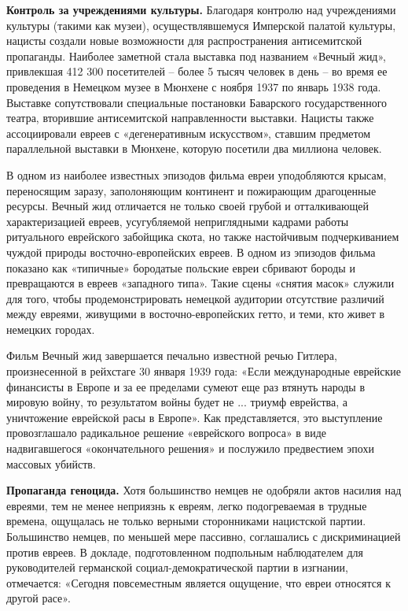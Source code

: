 \textbf{Контроль за учреждениями культуры.}  Благодаря контролю над учреждениями культуры (такими как музеи), осуществлявшемуся Имперской палатой культуры, нацисты создали новые возможности для распространения антисемитской пропаганды. Наиболее заметной стала выставка под названием «Вечный жид», привлекшая 412 300 посетителей – более 5 тысяч человек в день – во время ее проведения в Немецком музее в Мюнхене с ноября 1937 по январь 1938 года. Выставке сопутствовали специальные постановки Баварского государственного театра, вторившие антисемитской направленности выставки. Нацисты также ассоциировали евреев с «дегенеративным искусством», ставшим предметом параллельной выставки в Мюнхене, которую посетили два миллиона человек.

В одном из наиболее известных эпизодов фильма евреи уподобляются крысам, переносящим заразу, заполоняющим континент и пожирающим драгоценные ресурсы. Вечный жид отличается не только своей грубой и отталкивающей характеризацией евреев, усугубляемой неприглядными кадрами работы ритуального еврейского забойщика скота, но также настойчивым подчеркиванием чуждой природы восточно-европейских евреев. В одном из эпизодов фильма показано как «типичные» бородатые польские евреи сбривают бороды и превращаются в евреев «западного типа». Такие сцены «снятия масок» служили для того, чтобы продемонстрировать немецкой аудитории отсутствие различий между евреями, живущими в восточно-европейских гетто, и теми, кто живет в немецких городах.

Фильм Вечный жид завершается печально известной речью Гитлера, произнесенной в рейхстаге 30 января 1939 года: «Если международные еврейские финансисты в Европе и за ее пределами сумеют еще раз втянуть народы в мировую войну, то результатом войны будет не ... триумф еврейства, а уничтожение еврейской расы в Европе». Как представляется, это выступление провозглашало радикальное решение «еврейского вопроса» в виде надвигавшегося «окончательного решения» и послужило предвестием эпохи массовых убийств.

\textbf{Пропаганда геноцида.} Хотя большинство немцев не одобряли актов насилия над евреями, тем не менее неприязнь к евреям, легко подогреваемая в трудные времена, ощущалась не только верными сторонниками нацистской партии. Большинство немцев, по меньшей мере пассивно, соглашались с дискриминацией против евреев. В докладе, подготовленном подпольным наблюдателем для руководителей германской социал-демократической партии в изгнании, отмечается: «Сегодня повсеместным является ощущение, что евреи относятся к другой расе».

